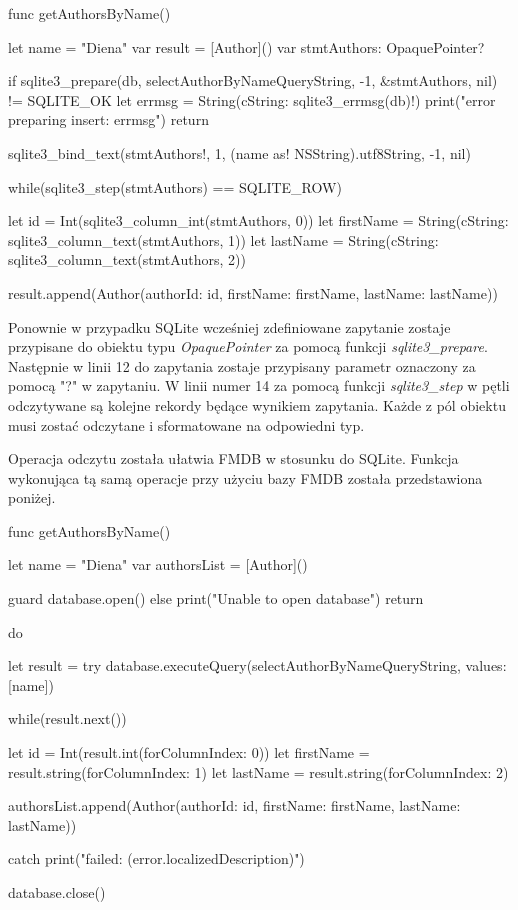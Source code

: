 \begin{code}[
		language=swift,
		caption={Przykład odczytu danych SQLite},
		label={lis:sqlite_read_code},
	]
    func getAuthorsByName() {
        let name = "Diena"
        var result = [Author]()
        var stmtAuthors: OpaquePointer?
        
        if sqlite3_prepare(db, selectAuthorByNameQueryString, -1, &stmtAuthors, nil) != SQLITE_OK {
            let errmsg = String(cString: sqlite3_errmsg(db)!)
            print("error preparing insert: errmsg")
            return
        }
        
        sqlite3_bind_text(stmtAuthors!, 1, (name as! NSString).utf8String, -1, nil)
        
        while(sqlite3_step(stmtAuthors) == SQLITE_ROW) {
            let id = Int(sqlite3_column_int(stmtAuthors, 0))
            let firstName = String(cString: sqlite3_column_text(stmtAuthors, 1))
            let lastName = String(cString: sqlite3_column_text(stmtAuthors, 2))
            
            result.append(Author(authorId: id, firstName: firstName, lastName: lastName))
        }
    }
\end{code}

Ponownie w przypadku SQLite wcześniej zdefiniowane zapytanie zostaje przypisane do obiektu typu \textit{OpaquePointer} za pomocą funkcji \textit{sqlite3\_prepare}. Następnie w linii 12 do zapytania zostaje przypisany parametr oznaczony za pomocą "?" w zapytaniu. W linii numer 14 za pomocą funkcji \textit{sqlite3\_step} w pętli odczytywane są kolejne rekordy będące wynikiem zapytania. Każde z pól obiektu musi zostać odczytane i sformatowane na odpowiedni typ. 

Operacja odczytu została ułatwia FMDB w stosunku do SQLite. Funkcja wykonująca tą samą operacje przy użyciu bazy FMDB została przedstawiona poniżej. 

\begin{code}[
		language=swift,
		caption={Przykład odczytu danych FMDB},
		label={lis:fmdb_read_code},
	]
func getAuthorsByName() {
        let name = "Diena"
        var authorsList = [Author]()
        
        guard database.open() else {
            print("Unable to open database")
            return
        }
        
        do {
            let result = try database.executeQuery(selectAuthorByNameQueryString, values: [name])
            
            while(result.next()) {
                let id = Int(result.int(forColumnIndex: 0))
                let firstName = result.string(forColumnIndex: 1)
                let lastName = result.string(forColumnIndex: 2)
                
                authorsList.append(Author(authorId: id, firstName: firstName, lastName: lastName))
            }
        } catch {
            print("failed: (error.localizedDescription)")
        }
        
        database.close()
    }
\end{code}

